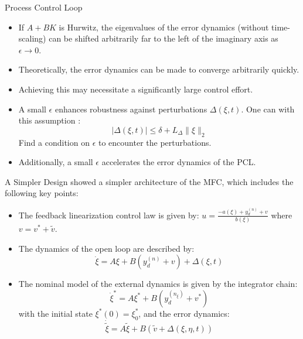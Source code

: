 \begin{frame}{Process Control Loop}
    \begin{itemize}
    \item If \( A + BK \) is Hurwitz, the eigenvalues of the error dynamics (without time-scaling) can be shifted arbitrarily far to the left of the imaginary axis as \( \epsilon \rightarrow 0 \).
    \item Theoretically, the error dynamics can be made to converge arbitrarily quickly.
    \item Achieving this may necessitate a significantly large control effort.
    \item A small \( \epsilon \) enhances robustness against perturbations \( \Delta(\xi, t) \). One can with this assumption : 
    \[
    |\Delta(\xi, t)| \leq \delta + L_\Delta \lVert \xi \rVert_2
    \]
    Find a condition on \(\epsilon\) to encounter the perturbations.
    \item Additionally, a small \( \epsilon \) accelerates the error dynamics of the PCL.
\end{itemize}
\end{frame}



\begin{frame}{A Simpler Design}
\cite{Tietze2023CruiseControl} showed a simpler architecture of the MFC, which includes the following key points:

\begin{itemize}
    \item The feedback linearization control law is given by:
    \(
    u = \frac{-a(\xi) + y_d^{(n)} + v}{b(\xi)}
    \)
    where \( v = v^* + \tilde{v} \).

    \item The dynamics of the open loop are described by:
    \[
    \dot{\xi} = A\xi + B(y_d^{(n)} + v) + \Delta(\xi, t)
    \]

    \item The nominal model of the external dynamics is given by the integrator chain:
    \[
    \dot{\xi}^* = A\xi^* + B(y_d^{(n_\xi)} + v^*)
    \]
    with the initial state \(\xi^*(0) = \xi_0^*\), and the error dynamics:
    \[
    \dot{\tilde{\xi}} = A\tilde{\xi} + B(\tilde{v} + \Delta(\xi, \eta, t))
    \]
\end{itemize}
\end{frame}

